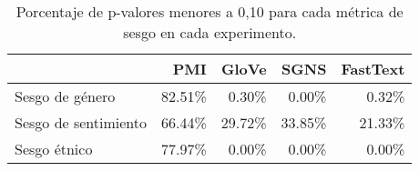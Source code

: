

\begin{table}[h]
  \centering
  \begin{tabular}{lrrrr}
    \toprule
                         & PMI     & GloVe   & SGNS    & FastText \\
    \midrule
    Sesgo de género      & 82.51\% & 0.30\%  & 0.00\%  & 0.32\%   \\
    Sesgo de sentimiento & 66.44\% & 29.72\% & 33.85\% & 21.33\%  \\
    Sesgo étnico         & 77.97\% & 0.00\%  & 0.00\%  & 0.00\%   \\
    \bottomrule
  \end{tabular}
  \caption{
    Porcentaje de p-valores menores a 0,10 para cada métrica de sesgo en cada experimento.
  }
  \label{tab:pvalues}
\end{table}

